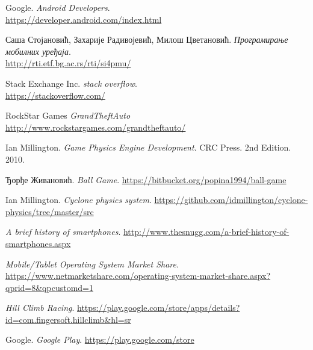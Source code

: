 \begin{thebibliography}{refs}
		Google.
		\emph{Android Developers}.\\
		\url{https://developer.android.com/index.html}

		Саша Стојановић, Захарије Радивојевић, Милош Цветановић.
		\emph{Програмирање мобилних уређаја}.\\
		\url{http://rti.etf.bg.ac.rs/rti/si4pmu/}

		Stack Exchange Inc.
		\emph{stack overflow}.\\
		\url{https://stackoverflow.com/}

		RockStar Games
		\emph{GrandTheftAuto}
		\url{http://www.rockstargames.com/grandtheftauto/}

		Ian Millington.
		\emph{Game Physics Engine Development}.
		CRC Press.
		2nd Edition. 2010.

		Ђорђе Живановић.
		\emph{Ball Game}.
		\url{https://bitbucket.org/popina1994/ball-game}


		Ian Millington.
		\emph{Cyclone physics system}.
		\url{https://github.com/idmillington/cyclone-physics/tree/master/src}

		\emph{A brief history of smartphones}.
		\url{http://www.thesnugg.com/a-brief-history-of-smartphones.aspx}

		\emph{Mobile/Tablet Operating System Market Share}.
		\url{https://www.netmarketshare.com/operating-system-market-share.aspx?qprid=8&qpcustomd=1}

		\emph{Hill Climb Racing}.
		\url{https://play.google.com/store/apps/details?id=com.fingersoft.hillclimb&hl=sr}
		
		Google.
		\emph{Google Play}.
		\url{https://play.google.com/store}






\end{thebibliography}
